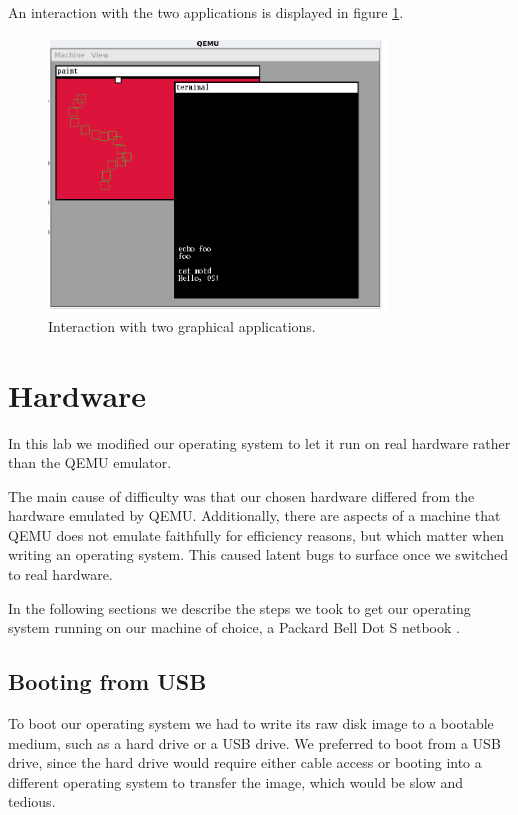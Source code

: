 \documentclass{report}
\begin{document}
An interaction with the two applications is displayed in figure \ref{desktop}.
\begin{figure}[h]
\centering
\includegraphics[width=0.8\textwidth]{interaction}
\caption{Interaction with two graphical applications.}
\label{desktop}
\end{figure}








\chapter{Hardware}
In this lab we modified our operating system to let it run on real hardware
rather than the QEMU emulator.

The main cause of difficulty was that our chosen hardware differed from the
hardware emulated by QEMU. Additionally, there are aspects of a machine that
QEMU does not emulate faithfully for efficiency reasons, but which matter when
writing an operating system. This caused latent bugs to surface once we
switched to real hardware.

In the following sections we describe the steps we took to get our operating
system running on our machine of choice, a Packard Bell Dot S netbook
\cite{netbook}.


\section{Booting from USB}
To boot our operating system we had to write its raw disk image to a bootable
medium, such as a hard drive or a USB drive. We preferred to boot from a USB
drive, since the hard drive would require either cable access or booting into
a different operating system to transfer the image, which would be slow and
tedious.
\end{document}
